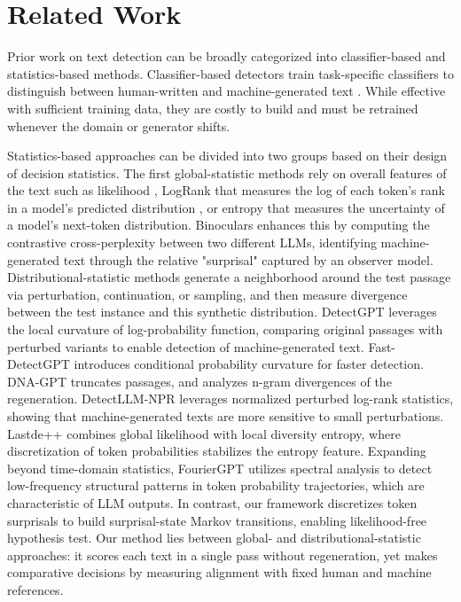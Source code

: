 \documentclass{article}
\theoremstyle{plain}
\theoremstyle{definition}
\theoremstyle{remark}
\begin{document}
\section{Related Work}\label{app:related-work}
Prior work on text detection can be broadly categorized into classifier-based and statistics-based methods. Classifier-based detectors train task-specific classifiers to distinguish between human-written and machine-generated text \citep{guo2023closechatgpthumanexperts,GPTZero,guo2024detective}. While effective with sufficient training data, they are costly to build and must be retrained whenever the domain or generator shifts.

Statistics-based approaches can be divided into two groups based on their design of decision statistics. The first global-statistic methods rely on overall features of the text such as likelihood \citep{solaiman2019releasestrategiessocialimpacts}, LogRank \citep{solaiman2019releasestrategiessocialimpacts} that measures the log of each token’s rank in a model’s predicted distribution , or entropy \citep{gehrmann-etal-2019-gltr} that measures the uncertainty of a model’s next-token distribution. Binoculars \citep{hans2024spotting} enhances this by computing the contrastive cross-perplexity between two different LLMs, identifying machine-generated text through the relative "surprisal" captured by an observer model. Distributional-statistic methods generate a neighborhood around the test passage via perturbation, continuation, or sampling, and then measure divergence between the test instance and this synthetic distribution. DetectGPT \citep{mitchell2023detectgptzeroshotmachinegeneratedtext} leverages the local curvature of log-probability function, comparing original passages with perturbed variants to enable detection of machine-generated text. Fast-DetectGPT \citep{bao2024fastdetectgpt} introduces conditional probability curvature for faster detection. DNA-GPT \citep{yang2023dnagptdivergentngramanalysis} truncates passages, and analyzes n-gram divergences of the regeneration. DetectLLM-NPR \citep{su2023detectllm} leverages normalized perturbed log-rank statistics, showing that machine-generated texts are more sensitive to small perturbations. Lastde++ \citep{xu2025trainingfree} combines global likelihood with local diversity entropy, where discretization of token probabilities stabilizes the entropy feature. Expanding beyond time-domain statistics, FourierGPT \citep{xu2024detectingsubtledifferenceshuman} utilizes spectral analysis to detect low-frequency structural patterns in token probability trajectories, which are characteristic of LLM outputs. In contrast, our framework discretizes token surprisals to build surprisal-state Markov transitions, enabling likelihood-free hypothesis test. Our method lies between global- and distributional-statistic approaches: it scores each text in a single pass without regeneration, yet makes comparative decisions by measuring alignment with fixed human and machine references.
\end{document}
